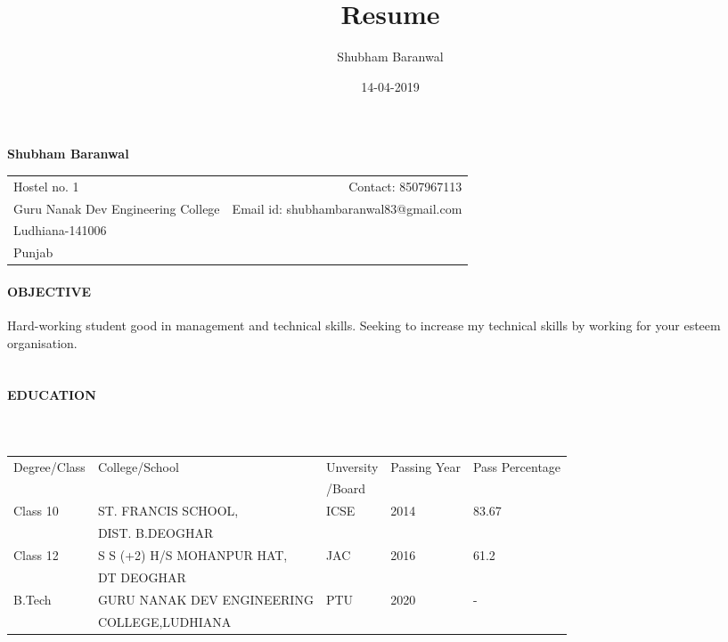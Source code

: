 \documentclass{article}
\title{Resume}
\date{14-04-2019}
\author{Shubham Baranwal}
\begin{document}
	\begin{center}
		\begin{Large}
			\textbf{Shubham Baranwal}
		\end{Large}
	\end{center}
	\hrulefill
	

	\begin{center} 
		\begin{tabular*}{\textwidth}{@{}l@{\extracolsep{\fill}}r@{}}
			Hostel no. 1  & Contact: 8507967113 \\
			Guru Nanak Dev Engineering College & Email id: shubhambaranwal83@gmail.com  \\
			Ludhiana-141006 &  \\
			Punjab & 
		\end{tabular*}
	\end{center}
		
			\begin{figure}[h!] 
				
				\hfill{}	
			\end{figure}
		
			\paragraph{\textbf{OBJECTIVE }}
			Hard-working student good in management and technical skills. Seeking to increase my technical skills by working for your esteem organisation.
			
    \paragraph{\textbf{ \\ EDUCATION }}
    \paragraph{\\}
	


	\begin{table}[h!]
		\begin{center}
			\begin{tabular}{|l|l|l|l|l|}
				\hline
				Degree/Class & College/School&Unversity& Passing Year & Pass Percentage\\
				&&/Board&&\\
				\hline
				Class 10& ST. FRANCIS SCHOOL, &ICSE&2014&83.67\\
				&DIST. B.DEOGHAR&&&\\
				\hline
				Class 12& S S (+2) H/S MOHANPUR HAT,&JAC&2016&61.2\\
				&DT DEOGHAR&&&\\
				\hline
				B.Tech&GURU NANAK DEV ENGINEERING& PTU&2020&-\\
				& COLLEGE,LUDHIANA&&&\\
				\hline
			\end{tabular}
		\end{center}
	\end{table}	
\end{document}
